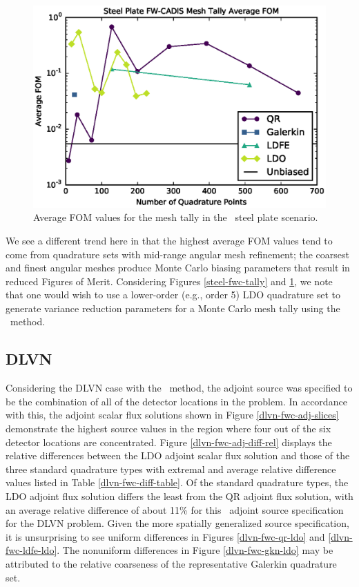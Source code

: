 \begin{figure}[!htb]
\centering
\includegraphics[max height=0.445\textheight]{img/steel-plots/mcnp/fwcadis-fom.eps}
\caption{Average FOM values for the mesh tally in the \fwc\ steel plate scenario.}
\label{steel-fwc-fom}
\end{figure}

We see a different trend here in that the highest average FOM values tend to come from
quadrature sets with mid-range angular mesh refinement; the coarsest and finest
angular meshes produce Monte Carlo biasing parameters that result in reduced Figures
of Merit. Considering Figures \ref{steel-fwc-tally} and \ref{steel-fwc-fom}, we note
that one would wish to use a lower-order (e.g., order 5) LDO quadrature set to generate
variance reduction parameters for a Monte Carlo mesh tally using the \fwc\ method.

\FloatBarrier
\subsection{DLVN}

Considering the DLVN case with the \fwc\ method, the adjoint source was specified to
be the combination of all of the detector locations in the problem. In accordance 
with this, the adjoint scalar flux solutions shown in Figure \ref{dlvn-fwc-adj-slices}
demonstrate the highest source values in the region where four out of the six
detector locations are concentrated. Figure \ref{dlvn-fwc-adj-diff-rel} displays the
relative differences between the LDO adjoint scalar flux solution and those of
the three standard quadrature types with extremal and average relative difference
values listed in Table \ref{dlvn-fwc-diff-table}. 
Of the standard quadrature types, the LDO adjoint flux solution differs the least from the QR
adjoint flux solution, with an average relative difference of about 11\% for this \fwc\ adjoint
source specification for the DLVN problem. Given the more spatially 
generalized source specification, it is unsurprising to see uniform differences in 
Figures \ref{dlvn-fwc-qr-ldo} and \ref{dlvn-fwc-ldfe-ldo}. The nonuniform differences 
in Figure \ref{dlvn-fwc-gkn-ldo} may be attributed to the relative coarseness of the
representative Galerkin quadrature set.

